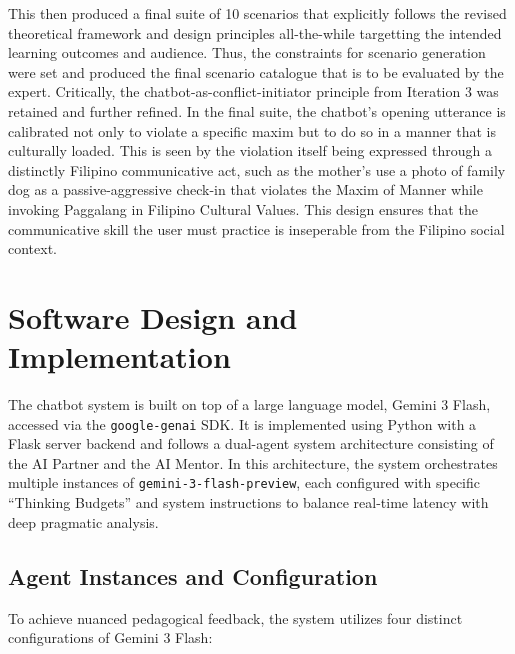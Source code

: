 This then produced a final suite of 10 scenarios that explicitly follows the revised theoretical framework and design principles all-the-while targetting the intended learning outcomes and audience. Thus, the constraints for scenario generation were set and produced the final scenario catalogue that is to be evaluated by the expert. 
Critically, the chatbot-as-conflict-initiator principle from Iteration 3 was retained and further refined. In the final suite, the chatbot's opening utterance is calibrated not only to violate a specific maxim but to do so in a manner that is culturally loaded. This is seen by the violation itself being expressed through a distinctly Filipino communicative act, such as
the mother's use a photo of family dog as a passive-aggressive check-in that violates the Maxim of Manner while invoking Paggalang in Filipino Cultural Values. This design ensures that the communicative skill the user must practice is inseperable from the Filipino social context.


\section{Software Design and Implementation}

The chatbot system is built on top of a large language model, Gemini 3 Flash, accessed via the \texttt{google-genai} SDK. It is implemented using Python with a Flask server backend and follows a dual-agent system architecture consisting of the AI Partner and the AI Mentor. In this architecture, the system orchestrates multiple instances of \texttt{gemini-3-flash-preview}, each configured with specific ``Thinking Budgets'' and system instructions to balance real-time latency with deep pragmatic analysis.

\subsection{Agent Instances and Configuration}
To achieve nuanced pedagogical feedback, the system utilizes four distinct configurations of Gemini 3 Flash:

